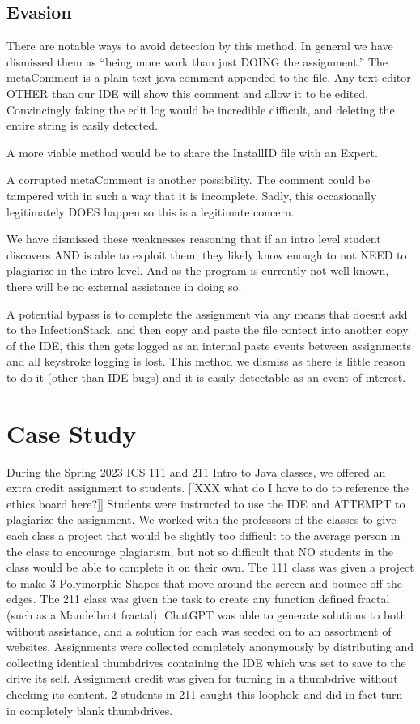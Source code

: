 \documentclass[12pt,final,thesis,actual]{uhthesis}
\newcommand{\n}{\hfill\break}
\newcommand{\installID}{InstallID\xspace}
\newcommand{\metaComment}{metaComment\xspace}
\newcommand{\infectionStack}{InfectionStack\xspace}
\begin{document}
\section{\textbf{Evasion}}
There are notable ways to avoid detection by this method.  In general we have dismissed them as ``being more work than just DOING the assignment.''  The \metaComment is a plain text java comment appended to the file.  Any text editor OTHER than our IDE will show this comment and allow it to be edited.  Convincingly faking the edit log would be incredible difficult, and deleting the entire string is easily detected.

A more viable method would be to share the \installID file with an Expert.


A corrupted \metaComment is another possibility.  The comment could be tampered with in such a way that it is incomplete.  Sadly, this occasionally legitimately DOES happen so this is a legitimate concern.

We have dismissed these weaknesses reasoning that if an intro level student discovers AND is able to exploit them, they likely know enough to not NEED to plagiarize in the intro level.  And as the program is currently not well known, there will be no external assistance in doing so.

A potential bypass is to complete the assignment via any means that doesnt add to the \infectionStack, and then copy and paste the file content into another copy of the IDE, this then gets logged as an internal paste events between assignments and all keystroke logging is lost.  This method we dismiss as there is little reason to do it (other than IDE bugs) and it is easily detectable as an event of interest.

\n\chapter*{\textbf{Case Study}}
During the Spring 2023 ICS 111 and 211 Intro to Java classes, we offered an extra credit assignment to students. [[XXX what do I have to do to reference the ethics board here?]]
Students were instructed to use the IDE and ATTEMPT to plagiarize the assignment.  We worked with the professors of the classes to give each class a project that would be slightly too difficult to the average person in the class to encourage plagiarism, but not so difficult that NO students in the class would be able to complete it on their own.  The 111 class was given a project to make 3 Polymorphic Shapes that move around the screen and bounce off the edges.  The 211 class was given the task to create any function defined fractal (such as a Mandelbrot fractal).  ChatGPT was able to generate solutions to both without assistance, and a solution for each was seeded on to an assortment of websites.  Assignments were collected completely anonymously by distributing and collecting identical thumbdrives containing the IDE which was set to save to the drive its self.  Assignment credit was given for turning in a thumbdrive without checking its content.  2 students in 211 caught this loophole and did in-fact turn in completely blank thumbdrives.
\end{document}
